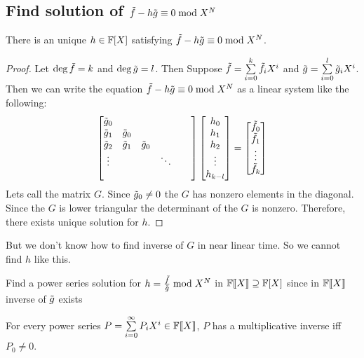 \subsection{Find solution of \texorpdfstring{$\tilde{f}-h\tilde{g}\equiv 0\bmod {X^N}$}{f-fg=0 mod X\^N}}
\begin{algoprob}
\end{algoprob}
\begin{lemma}{}{}
	There is an unique $h\in\mathbb{F}[X]$ satisfying $\tilde{f}-h\tilde{g}\equiv 0\bmod{X^N}$.
\end{lemma}
\begin{proof}
	Let $\deg \tilde{f}=k$ and $\deg\tilde{g}=l$. Then Suppose $\tilde{f}=\sum\limits_{i=0}^k\tilde{f}_iX^i$ and $\tilde{g}=\sum\limits_{i=0}^l\tilde{g}_iX^i$. Then we can write the equation  $\tilde{f}-h\tilde{g}\equiv 0\bmod{X^N}$ as a linear system like the following: $$\left[\begin{matrix}\tilde{g}_0 & \\ \tilde{g}_1 & \tilde{g}_0&\\ \tilde{g}_2&\tilde{g}_1&\tilde{g}_0 & \\ \vdots
		& & & \ddots & \\ & & & & &\end{matrix}\right]\left[\begin{matrix}h_0\\ h_1 \\ h_2\\ \vdots \\ h_{k-l}\end{matrix}\right]=\left[\begin{matrix}\tilde{f}_0\\ \tilde{f}_1\\ \vdots \\ \tilde{f}_k\end{matrix}\right]$$Lets call the matrix $G$. Since $\tilde{g}_0\neq 0$ the $G$ has nonzero elements in the diagonal. Since the $G$ is lower triangular the determinant of the $G$ is nonzero. Therefore, there exists unique solution for $h$.
\end{proof}

But we don't know how to find inverse of $G$ in near linear time. So we cannot find $h$ like this.
\begin{idea*}
	Find a power series solution for $h=\frac{\tilde{f}}{\tilde{g}}\bmod {X^N}$ in $\mathbb{F}\llbracket X\rrbracket\supseteq \mathbb{F}[X]$ since in $\mathbb{F}\llbracket X\rrbracket$ inverse of $\tilde{g}$ exists
\end{idea*}
\begin{lemma}{}{}
	For every power series $P=\sum\limits_{i=0}^{\infty}P_iX^i\in\mathbb{F}\llbracket X\rrbracket$, $P$ has a multiplicative inverse iff $P_0\neq 0$.
\end{lemma}

